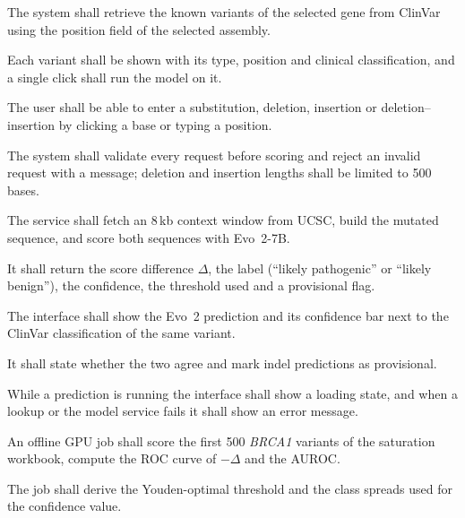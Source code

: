 \vspace{4pt}
\begin{subitemize}
\item The system shall retrieve the known variants of the selected gene from ClinVar using the position field of the selected assembly.
\item Each variant shall be shown with its type, position and clinical classification, and a single click shall run the model on it.
\end{subitemize}

\vspace{4pt}
\begin{subitemize}
\item The user shall be able to enter a substitution, deletion, insertion or deletion--insertion by clicking a base or typing a position.
\item The system shall validate every request before scoring and reject an invalid request with a message; deletion and insertion lengths shall be limited to 500 bases.
\end{subitemize}

\begin{subitemize}
\item The service shall fetch an 8\,kb context window from UCSC, build the mutated sequence, and score both sequences with Evo~2-7B.
\item It shall return the score difference $\Delta$, the label (``likely pathogenic'' or ``likely benign''), the confidence, the threshold used and a provisional flag.
\end{subitemize}

\vspace{4pt}
\begin{subitemize}
\item The interface shall show the Evo~2 prediction and its confidence bar next to the ClinVar classification of the same variant.
\item It shall state whether the two agree and mark indel predictions as provisional.
\item While a prediction is running the interface shall show a loading state, and when a lookup or the model service fails it shall show an error message.
\end{subitemize}

\vspace{4pt}
\begin{subitemize}
\item An offline GPU job shall score the first 500 \textit{BRCA1} variants of the saturation workbook, compute the ROC curve of $-\Delta$ and the AUROC.
\item The job shall derive the Youden-optimal threshold and the class spreads used for the confidence value.
\end{subitemize}

